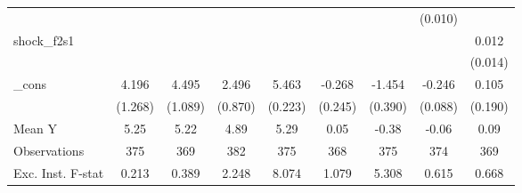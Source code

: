 {\begin{tabular}{l*{8}{c}}
            &                     &                     &                     &                     &                     &                     &     (0.010)         &                     \\
\addlinespace
shock\_f2s1  &                     &                     &                     &                     &                     &                     &                     &       0.012         \\
            &                     &                     &                     &                     &                     &                     &                     &     (0.014)         \\
\addlinespace
\_cons      &       4.196\sym{***}&       4.495\sym{***}&       2.496\sym{***}&       5.463\sym{***}&      -0.268         &      -1.454\sym{***}&      -0.246\sym{***}&       0.105         \\
            &     (1.268)         &     (1.089)         &     (0.870)         &     (0.223)         &     (0.245)         &     (0.390)         &     (0.088)         &     (0.190)         \\
\midrule
Mean Y      &        5.25         &        5.22         &        4.89         &        5.29         &        0.05         &       -0.38         &       -0.06         &        0.09         \\
Observations&         375         &         369         &         382         &         375         &         368         &         375         &         374         &         369         \\
Exc. Inst. F-stat&       0.213         &       0.389         &       2.248         &       8.074         &       1.079         &       5.308         &       0.615         &       0.668         \\
\bottomrule
\end{tabular}
}
